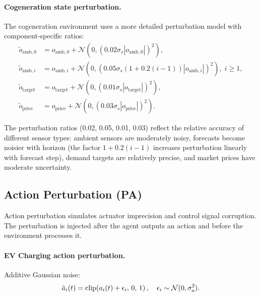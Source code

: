 \paragraph{Cogeneration state perturbation.} The cogeneration environment uses a more detailed perturbation model with component-specific ratios:
\begin{align}
    \tilde{o}_{\text{amb},0} &= o_{\text{amb},0} + \mathcal{N}(0, (0.02\sigma_s |o_{\text{amb},0}|)^2), \label{eq:cogen_obs_amb0} \\
    \tilde{o}_{\text{amb},i} &= o_{\text{amb},i} + \mathcal{N}(0, (0.05\sigma_s (1{+}0.2(i{-}1)) |o_{\text{amb},i}|)^2), \; i \geq 1, \label{eq:cogen_obs_ambi} \\
    \tilde{o}_{\text{target}} &= o_{\text{target}} + \mathcal{N}(0, (0.01\sigma_s |o_{\text{target}}|)^2), \label{eq:cogen_obs_target} \\
    \tilde{o}_{\text{price}} &= o_{\text{price}} + \mathcal{N}(0, (0.03\sigma_s |o_{\text{price}}|)^2). \label{eq:cogen_obs_price}
\end{align}

The perturbation ratios (0.02, 0.05, 0.01, 0.03) reflect the relative accuracy of different sensor types: ambient sensors are moderately noisy, forecasts become noisier with horizon (the factor $1 + 0.2(i-1)$ increases perturbation linearly with forecast step), demand targets are relatively precise, and market prices have moderate uncertainty.

\subsection{Action Perturbation (PA)}
\label{sec:act_noise}

Action perturbation simulates actuator imprecision and control signal corruption. The perturbation is injected after the agent outputs an action and before the environment processes it.

\paragraph{EV Charging action perturbation.} Additive Gaussian noise:
\begin{equation}
    \tilde{a}_i(t) = \operatorname{clip}\!\left(a_i(t) + \epsilon_i, \, 0, \, 1\right), \quad \epsilon_i \sim \mathcal{N}(0, \sigma_a^2).
    \label{eq:ev_act_noise}
\end{equation}

